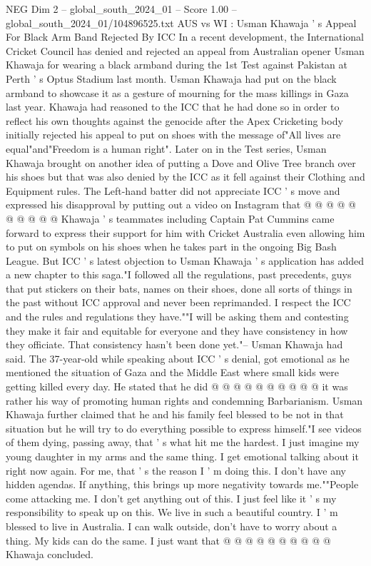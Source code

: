 \begin{textsample}{NEG Dim 2 – global\_south\_2024\_01 – Score 1.00 – global\_south\_2024\_01/104896525.txt}  \label{ex:f2_neg_346}
AUS vs WI : Usman Khawaja ' s Appeal For Black Arm Band Rejected By ICC In a recent development, the International Cricket Council has denied and rejected an appeal from Australian opener Usman Khawaja for wearing a black armband during the 1st Test against Pakistan at Perth ' s Optus Stadium last month.
Usman Khawaja had put on the black armband to showcase it as a gesture of mourning for the mass killings in Gaza last year.
Khawaja had reasoned to the ICC that he had done so in order to reflect his own thoughts against the genocide after the Apex Cricketing body initially rejected his appeal to put on shoes with the message of"All lives are equal"and"Freedom is a human right".
Later on in the Test series, Usman Khawaja brought on another idea of putting a Dove and Olive Tree branch over his shoes but that was also denied by the ICC as it fell against their Clothing and Equipment rules.
The Left-hand batter did not appreciate ICC ' s move and expressed his disapproval by putting out a video on Instagram that @ @ @ @ @ @ @ @ @ @ Khawaja ' s teammates including Captain Pat Cummins came forward to express their support for him with Cricket Australia even allowing him to put on symbols on his shoes when he takes part in the ongoing Big Bash League.
But ICC ' s latest objection to Usman Khawaja ' s application has added a new chapter to this saga."I followed all the regulations, past precedents, guys that put stickers on their bats, names on their shoes, done all sorts of things in the past without ICC approval and never been reprimanded.
I respect the ICC and the rules and regulations they have.""I will be asking them and contesting they make it fair and equitable for everyone and they have consistency in how they officiate.
That consistency hasn't been done yet."-- Usman Khawaja had said.
The 37-year-old while speaking about ICC ' s denial, got emotional as he mentioned the situation of Gaza and the Middle East where small kids were getting killed every day.
He stated that he did @ @ @ @ @ @ @ @ @ @ it was rather his way of promoting human rights and condemning Barbarianism.
Usman Khawaja further claimed that he and his family feel blessed to be not in that situation but he will try to do everything possible to express himself."I see videos of them dying, passing away, that ' s what hit me the hardest.
I just imagine my young daughter in my arms and the same thing.
I get emotional talking about it right now again.
For me, that ' s the reason I ' m doing this.
I don't have any hidden agendas.
If anything, this brings up more negativity towards me.""People come attacking me.
I don't get anything out of this.
I just feel like it ' s my responsibility to speak up on this.
We live in such a beautiful country.
I ' m blessed to live in Australia.
I can walk outside, don't have to worry about a thing.
My kids can do the same.
I just want that @ @ @ @ @ @ @ @ @ @ Khawaja concluded.

\end{textsample}
